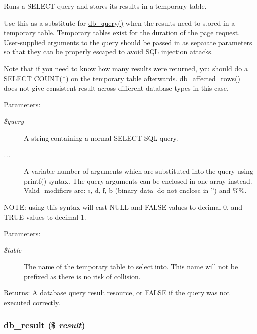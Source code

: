 Runs a SELECT query and stores its results in a temporary table.

Use this as a substitute for \hyperlink{database_8mysql-common_8inc_9e096321b86945d128746ac7bedce8f3}{db\_\-query()} when the results need to stored in a temporary table. Temporary tables exist for the duration of the page request. User-supplied arguments to the query should be passed in as separate parameters so that they can be properly escaped to avoid SQL injection attacks.

Note that if you need to know how many results were returned, you should do a SELECT COUNT($\ast$) on the temporary table afterwards. \hyperlink{database_8mysql_8inc_e3bc677fbeebd688068ce3b413ac2944}{db\_\-affected\_\-rows()} does not give consistent result across different database types in this case.

\begin{Desc}
\item[Parameters:]
\begin{description}
\item[{\em \$query}]A string containing a normal SELECT SQL query. \item[{\em ...}]A variable number of arguments which are substituted into the query using printf() syntax. The query arguments can be enclosed in one array instead. Valid -modifiers are: s, d, f, b (binary data, do not enclose in '') and \%\%.\end{description}
\end{Desc}
NOTE: using this syntax will cast NULL and FALSE values to decimal 0, and TRUE values to decimal 1.

\begin{Desc}
\item[Parameters:]
\begin{description}
\item[{\em \$table}]The name of the temporary table to select into. This name will not be prefixed as there is no risk of collision. \end{description}
\end{Desc}
\begin{Desc}
\item[Returns:]A database query result resource, or FALSE if the query was not executed correctly. \end{Desc}
\hypertarget{database_8mysql_8inc_953354ea01b236440b187210dc18aad9}{
\subsubsection[{db\_\-result}]{\setlength{\rightskip}{0pt plus 5cm}db\_\-result (\$ {\em result})}}
\label{database_8mysql_8inc_953354ea01b236440b187210dc18aad9}


